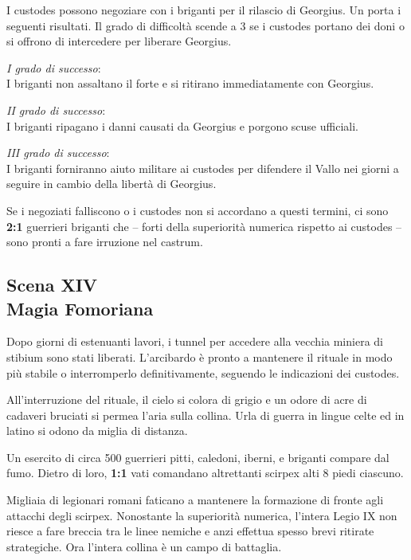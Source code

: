 \documentclass[11.5pt,twocolumn]{article}
\begin{document}
I custodes possono negoziare con i briganti per il rilascio di Georgius.
Un  porta i seguenti risultati.
Il grado di difficolt\`{a} scende a 3 se i custodes portano dei doni o si offrono di intercedere per liberare Georgius.

\emph{I grado di successo}:\\
I briganti non assaltano il forte e si ritirano immediatamente con Georgius.

\emph{II grado di successo}:\\
I briganti ripagano i danni causati da Georgius e porgono scuse ufficiali.

\emph{III grado di successo}:\\
I briganti forniranno aiuto militare ai custodes per difendere il Vallo nei giorni a seguire in cambio della libert\`{a} di Georgius.

Se i negoziati falliscono o i custodes non si accordano a questi termini, ci sono \textbf{2:1} guerrieri briganti che -- forti della superiorit\`{a} numerica rispetto ai custodes -- sono pronti a fare irruzione nel castrum.

\subsection*{Scena XIV\\Magia Fomoriana}
%
Dopo giorni di estenuanti lavori, i tunnel per accedere alla vecchia miniera di stibium sono stati liberati.
L'arcibardo \`{e} pronto a mantenere il rituale in modo pi\`{u} stabile o interromperlo definitivamente, seguendo le indicazioni dei custodes.

All'interruzione del rituale, il cielo si colora di grigio e un odore di acre di cadaveri bruciati si permea l'aria sulla collina.
Urla di guerra in lingue celte ed in latino si odono da miglia di distanza.


Un esercito di circa 500 guerrieri pitti, caledoni, iberni, e briganti compare dal fumo.
Dietro di loro, \textbf{1:1} vati comandano altrettanti scirpex alti 8 piedi ciascuno.

Migliaia di legionari romani faticano a mantenere la formazione di fronte agli attacchi degli scirpex.
Nonostante la superiorit\`{a} numerica, l'intera Legio IX non riesce a fare breccia tra le linee nemiche e anzi effettua spesso brevi ritirate strategiche.
Ora l'intera collina \`{e} un campo di battaglia.
\end{document}
